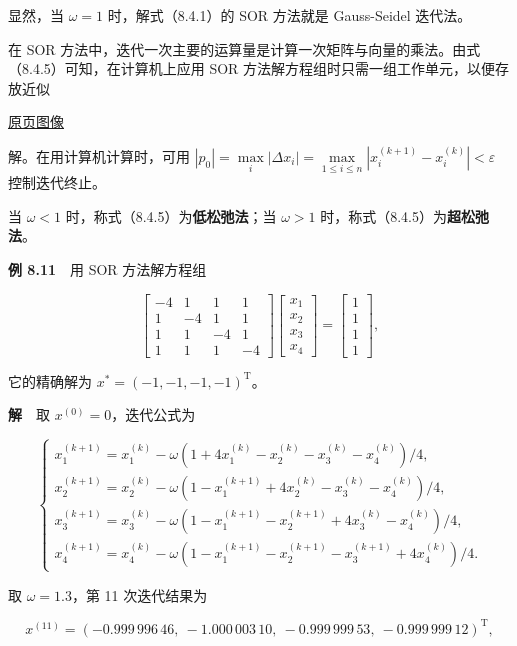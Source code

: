 \documentclass[
  10pt,
  fontset=fandol]{ctexart}
\begin{document}
显然，当 \(\omega=1\) 时，解式（8.4.1）的 SOR 方法就是 Gauss-Seidel 迭代法。

在 SOR 方法中，迭代一次主要的运算量是计算一次矩阵与向量的乘法。由式（8.4.5）可知，在计算机上应用 SOR 方法解方程组时只需一组工作单元，以便存放近似

\href{../../source-images/pdf-227.jpeg}{原页图像}

解。在用计算机计算时，可用 \(|p_0|=\max\limits_i|\Delta x_i|=\max\limits_{1\leqslant i\leqslant n}|x_i^{(k+1)}-x_i^{(k)}|<\varepsilon\) 控制迭代终止。

当 \(\omega<1\) 时，称式（8.4.5）为\textbf{低松弛法}；当 \(\omega>1\) 时，称式（8.4.5）为\textbf{超松弛法}。

\textbf{例 8.11}　用 SOR 方法解方程组

\[
\begin{bmatrix}-4&1&1&1\\1&-4&1&1\\1&1&-4&1\\1&1&1&-4\end{bmatrix}
\begin{bmatrix}x_1\\x_2\\x_3\\x_4\end{bmatrix}
=\begin{bmatrix}1\\1\\1\\1\end{bmatrix},
\]

它的精确解为 \(x^*=(-1,-1,-1,-1)^{\mathrm T}\)。

\textbf{解}　取 \(x^{(0)}=0\)，迭代公式为

\[
\begin{cases}
x_1^{(k+1)}=x_1^{(k)}-\omega(1+4x_1^{(k)}-x_2^{(k)}-x_3^{(k)}-x_4^{(k)})/4,\\
x_2^{(k+1)}=x_2^{(k)}-\omega(1-x_1^{(k+1)}+4x_2^{(k)}-x_3^{(k)}-x_4^{(k)})/4,\\
x_3^{(k+1)}=x_3^{(k)}-\omega(1-x_1^{(k+1)}-x_2^{(k+1)}+4x_3^{(k)}-x_4^{(k)})/4,\\
x_4^{(k+1)}=x_4^{(k)}-\omega(1-x_1^{(k+1)}-x_2^{(k+1)}-x_3^{(k+1)}+4x_4^{(k)})/4.
\end{cases}
\]

取 \(\omega=1.3\)，第 11 次迭代结果为

\[
x^{(11)}=(-0.999\,996\,46,\ -1.000\,003\,10,\ -0.999\,999\,53,\ -0.999\,999\,12)^{\mathrm T},
\]
\end{document}
